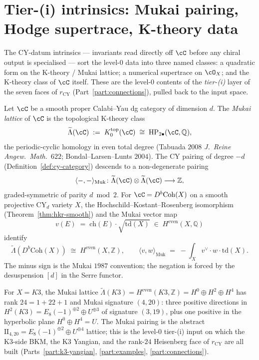 \section{Tier-(i) intrinsics: Mukai pairing, Hodge supertrace, K-theory data}
\label{sec:cy-cat-tier-i-intrinsics}

The CY-datum intrinsics — invariants read directly off $\cC$ before any
chiral output is specialised — sort the level-$0$ data into three named
classes: a quadratic form on the K-theory / Mukai lattice; a numerical
supertrace on $\cO_X$; and the K-theory class of $\cC$ itself. These
are the level-$0$ contents of the \emph{tier-(i)} layer of the seven
faces of $r_{\mathrm{CY}}$ (Part~\ref{part:connections}), pulled back
to the input space.

\begin{definition}
\label{def:cy-cat-mukai-lattice}
Let $\cC$ be a smooth proper Calabi--Yau dg category of dimension $d$.
The \emph{Mukai lattice} of $\cC$ is the topological K-theory class
\[
 \widetilde\Lambda(\cC) \;:=\; K_0^{\mathrm{top}}(\cC) \;\cong\;
 \mathrm{HP}_{2\bullet}(\cC, \mathbb Q),
\]
the periodic-cyclic homology in even total degree
(Tabuada $2008$ \emph{J.~Reine Angew.~Math.}~$622$;
Bondal--Larsen--Lunts $2004$). The CY pairing of degree $-d$
(Definition~\ref{def:cy-category}) descends to a non-degenerate pairing
\[
 \langle -, - \rangle_{\mathrm{Muk}} \colon
 \widetilde\Lambda(\cC) \otimes \widetilde\Lambda(\cC)
 \longrightarrow \mathbb Z,
\]
graded-symmetric of parity $d \bmod 2$. For $\cC = D^b\mathrm{Coh}(X)$
on a smooth projective CY$_d$ variety $X$, the Hochschild--Kostant--Rosenberg
isomorphism (Theorem~\ref{thm:hkr-smooth}) and the Mukai vector map
\[
 v(E) \;=\; \mathrm{ch}(E) \cdot \sqrt{\mathrm{td}(X)}
 \;\in\; H^{\mathrm{even}}(X, \mathbb Q)
\]
identify
\[
 \widetilde\Lambda(D^b\mathrm{Coh}(X)) \;\cong\;
 H^{\mathrm{even}}(X, \mathbb Z),
 \qquad
 \langle v, w\rangle_{\mathrm{Muk}}
 \;=\;
 -\!\int_X v^\vee \cdot w \cdot \mathrm{td}(X).
\]
The minus sign is the Mukai $1987$ convention; the negation is forced
by the desuspension $[d]$ in the Serre functor.
\end{definition}

\begin{example}
\label{ex:cy-cat-mukai-k3}
For $X = K3$, the Mukai lattice
$\widetilde\Lambda(K3) = H^{\mathrm{even}}(K3, \mathbb Z)
 = H^0 \oplus H^2 \oplus H^4$
has rank $24 = 1 + 22 + 1$ and Mukai signature $(4, 20)$:
three positive directions in $H^2(K3) = E_8(-1)^{\oplus 2} \oplus U^{\oplus 3}$
of signature $(3, 19)$, plus one positive in the hyperbolic plane
$H^0 \oplus H^4 = U$. The Mukai pairing is the abstract
$\mathrm{II}_{4, 20} = E_8(-1)^{\oplus 2} \oplus U^{\oplus 4}$ lattice;
this is the level-$0$ tier-(i) input on which the K3-side BKM,
the K3 Yangian, and the rank-$24$ Heisenberg face of $r_{\mathrm{CY}}$
are all built (Parts~\ref{part:k3-yangian}, \ref{part:examples},
\ref{part:connections}).
\end{example}

